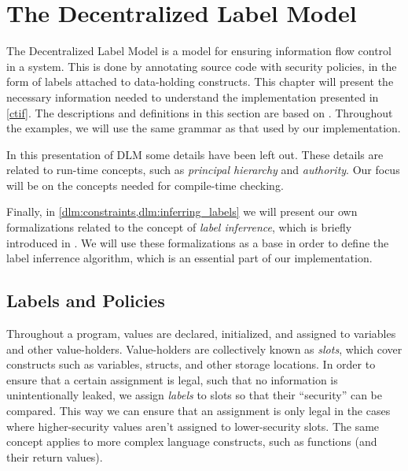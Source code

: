 
\newcommand{\labelof}[1]{\underline{#1}}
\newcommand{\dlmactsfor}{\dlmc{if\_acts\_for}}
\newcommand{\dlmdeclassify}{\dlmc{declassify}}
\newcommand{\dlmpc}{$\underline{pc}$}
\newcommand{\mathcomment}[1]{\color{green!50!black}{#1}}
\newcommand{\ceil}[1]{\lceil#1\rceil}

\chapter{The Decentralized Label Model}\label{dlm}
The Decentralized Label Model \cite{myers1997, myers1998, myers2000} is a model for ensuring information flow control in a system.
This is done by annotating source code with security policies, in the form of labels attached to data-holding constructs.
This chapter will present the necessary information needed to understand the implementation presented in \cref{ctif}.
The descriptions and definitions in this section are based on \cite{myers1997, myers1998, myers2000}.
Throughout the examples, we will use the same grammar as that used by our implementation.

In this presentation of DLM some details have been left out.
These details are related to run-time concepts, such as \emph{principal hierarchy} and \emph{authority}.
Our focus will be on the concepts needed for compile-time checking.

Finally, in \cref{dlm:constraints,dlm:inferring_labels} we will present our own formalizations related to the concept of \emph{label inferrence}, which is briefly introduced in \cite{myers1997}.
We will use these formalizations as a base in order to define the label inferrence algorithm, which is an essential part of our implementation.

\section{Labels and Policies}\label{dlm:policies}
Throughout a program, values are declared, initialized, and assigned to variables and other value-holders.
Value-holders are collectively known as \emph{slots}, which cover constructs such as variables, structs, and other storage locations.
In order to ensure that a certain assignment is legal, such that no information is unintentionally leaked, we assign \emph{labels} to slots so that their ``security'' can be compared.
This way we can ensure that an assignment is only legal in the cases where higher-security values aren't assigned to lower-security slots.
The same concept applies to more complex language constructs, such as functions (and their return values).

